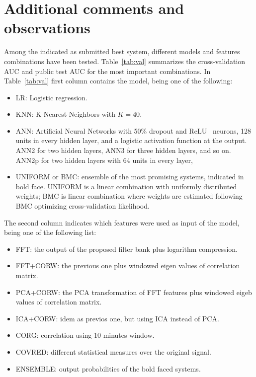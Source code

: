 \documentclass[a4paper,english,twoside]{article}
\begin{document}
\section{Additional comments and
  observations}\label{additional-comments-and-observations}

Among the indicated as submitted best system, different models and
features combinations have been tested. Table~\ref{tab:val} summarizes
the cross-validation AUC and public test AUC for the most important
combinations. In Table~\ref{tab:val} first column contains the model, being one
of the following:

\begin{itemize}
\item
  LR: Logistic regression.
\item
  KNN: K-Nearest-Neighbors with $K=40$.
\item ANN: Artificial Neural Networks with 50\% dropout and
  ReLU~\cite{2011:glorot:aistats} neurons, 128 units in every hidden layer, and
  a logistic activation function at the output.  ANN2 for two hidden layers,
  ANN3 for three hidden layers, and so on. ANN2p for two hidden layers with 64
  units in every layer,
\item
  UNIFORM or BMC: ensemble of the most promising systems, indicated in
  bold face. UNIFORM is a linear combination with uniformly distributed
  weights; BMC is linear combination where weights are estimated
  following BMC optimizing cross-validation likelihood.
\end{itemize}

The second column indicates which features were used as input of the
model, being one of the following list:

\begin{itemize}
\item
  FFT: the output of the proposed filter bank plus logarithm
  compression.
\item
  FFT+CORW: the previous one plus windowed eigen values of correlation
  matrix.
\item
  PCA+CORW: the PCA transformation of FFT features plus windowed eigeb
  values of correlation matrix.
\item
  ICA+CORW: idem as previos one, but using ICA instead of PCA.
\item
  CORG: correlation using 10 minutes window.
\item
  COVRED: different statistical measures over the original signal.
\item
  ENSEMBLE: output probabilities of the bold faced systems.
\end{itemize}
\end{document}
